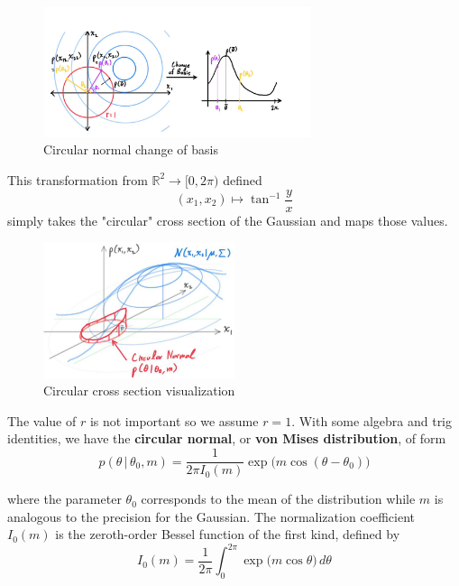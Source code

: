 \documentclass{article}
\begin{document}
    \begin{figure}[H]
      \centering
      \includegraphics[width=0.7\textwidth]{img/circular_normal_change_of_basis.jpg}
      \caption{Circular normal change of basis}
    \end{figure}

    This transformation from $\mathbb{R}^2 \longrightarrow [0, 2\pi)$ defined
    \begin{equation}
      (x_1, x_2) \mapsto \tan^{-1} \frac{y}{x}
    \end{equation}
    simply takes the "circular" cross section of the Gaussian and maps those values.

    \begin{figure}[H]
      \centering
      \includegraphics[width=0.5\textwidth]{img/Circular_Cross_Section.jpg}
      \caption{Circular cross section visualization}
    \end{figure}

    The value of $r$ is not important so we assume $r=1$. With some algebra and trig identities, we have the \textbf{circular normal}, or \textbf{von Mises distribution}, of form
    \begin{equation}
      p(\theta\,|\,\theta_0, m) = \frac{1}{2\pi I_0(m)} \exp \big( m \cos(\theta - \theta_0) \big)
    \end{equation}

    where the parameter $\theta_0$ corresponds to the mean of the distribution while $m$ is analogous to the precision for the Gaussian. The normalization coefficient $I_0(m)$ is the zeroth-order Bessel function of the first kind, defined by
    \begin{equation}
      I_0(m) = \frac{1}{2\pi} \int_0^{2\pi} \exp \big( m \cos{\theta}\big) \, d\theta
    \end{equation}
\end{document}
